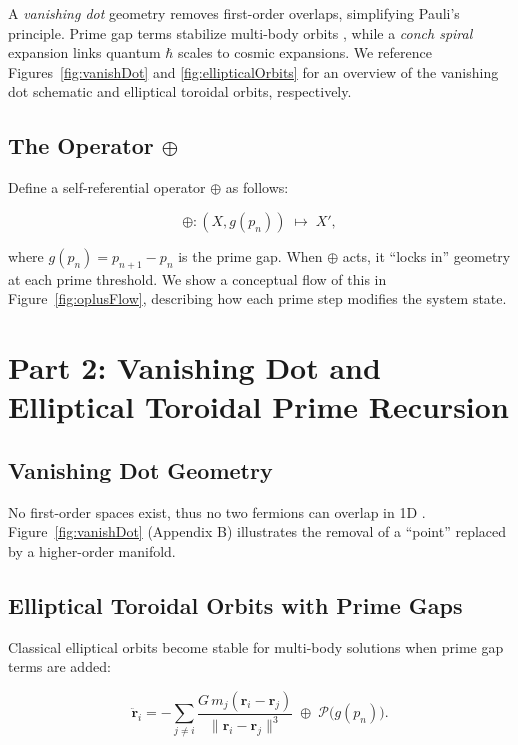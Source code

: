 \documentclass[11pt]{article}
\begin{document}
A \textit{vanishing dot} geometry removes first-order overlaps, simplifying Pauli’s principle. Prime gap terms stabilize multi-body orbits \cite{Poincare1892}, while a \textit{conch spiral} expansion links quantum $\hbar$ scales to cosmic expansions. We reference Figures~\ref{fig:vanishDot} and \ref{fig:ellipticalOrbits} for an overview of the vanishing dot schematic and elliptical toroidal orbits, respectively.

\subsection{The Operator \texorpdfstring{$\oplus$}{\oplus}}
Define a self-referential operator $\oplus$ as follows:

$$
\oplus: (X, g(p_n)) \;\mapsto\; X',
$$

where $g(p_n) = p_{n+1} - p_n$ is the prime gap. When $\oplus$ acts, it “locks in” geometry at each prime threshold. We show a conceptual flow of this in Figure~\ref{fig:oplusFlow}, describing how each prime step modifies the system state.

\clearpage

\section{Part 2: Vanishing Dot and Elliptical Toroidal Prime Recursion}
\label{part2}

\subsection{Vanishing Dot Geometry}
No first-order spaces exist, thus no two fermions can overlap in 1D \cite{Pauli1925}. Figure~\ref{fig:vanishDot} (Appendix B) illustrates the removal of a “point” replaced by a higher-order manifold.

\subsection{Elliptical Toroidal Orbits with Prime Gaps}
Classical elliptical orbits \cite{Newton1687} become stable for multi-body solutions when prime gap terms are added:

$$
\ddot{\mathbf{r}}_i 
= -\sum_{j \neq i} \frac{G\,m_j (\mathbf{r}_i - \mathbf{r}_j)}{\|\mathbf{r}_i - \mathbf{r}_j\|^3}
\;\oplus\;
\mathcal{P}\bigl(g(p_n)\bigr).
$$
\end{document}
